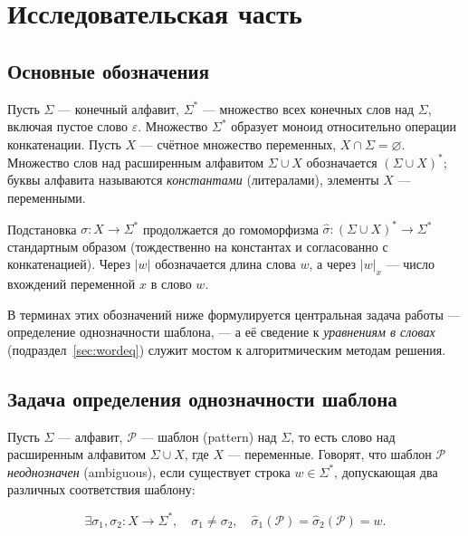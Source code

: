 \documentclass[14pt, russian]{scrartcl}
\begin{document}
\section{Исследовательская часть}

\subsection{Основные обозначения}

Пусть $\Sigma$ --- конечный алфавит, $\Sigma^*$ --- множество всех конечных слов над $\Sigma$,
включая пустое слово $\varepsilon$. Множество $\Sigma^*$ образует моноид относительно
операции конкатенации. Пусть $X$ --- счётное множество переменных, $X \cap \Sigma = \varnothing$.
Множество слов над расширенным алфавитом $\Sigma \cup X$ обозначается $(\Sigma \cup X)^*$;
буквы алфавита называются \textit{константами} (литералами), элементы $X$ --- переменными.

Подстановка $\sigma : X \to \Sigma^*$ продолжается до гомоморфизма
$\hat{\sigma} : (\Sigma \cup X)^* \to \Sigma^*$ стандартным образом (тождественно на
константах и согласованно с конкатенацией). Через $|w|$ обозначается длина слова $w$, а
через $|w|_{x}$ --- число вхождений переменной $x$ в слово $w$.

В терминах этих обозначений ниже формулируется центральная задача работы --- определение
однозначности шаблона, --- а её сведение к \textit{уравнениям в словах}
(подраздел~\ref{sec:wordeq}) служит мостом к алгоритмическим методам решения.

\subsection{Задача определения однозначности шаблона}

Пусть $\Sigma$ --- алфавит, $\mathcal{P}$ --- шаблон (pattern) над $\Sigma$, то есть слово
над расширенным алфавитом $\Sigma \cup X$, где $X$ --- переменные. Говорят, что шаблон
$\mathcal{P}$ \textit{неоднозначен} (ambiguous), если существует строка $w \in \Sigma^*$,
допускающая два различных соответствия шаблону:

\begin{equation}
\exists \sigma_1, \sigma_2 : X \to \Sigma^*,\quad \sigma_1 \neq \sigma_2,\quad
\hat{\sigma}_1(\mathcal{P}) = \hat{\sigma}_2(\mathcal{P}) = w.
\end{equation}
\end{document}
